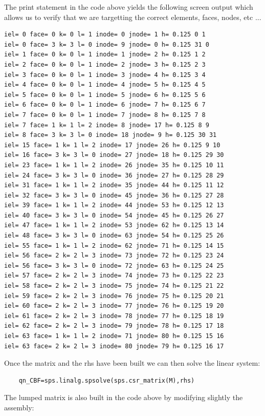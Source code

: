 The print statement in the code above yields the following screen output
which allows us to verify that we are targetting the correct elements, faces, nodes, etc ...
\begin{lstlisting}
iel= 0 face= 0 k= 0 l= 1 inode= 0 jnode= 1 h= 0.125 0 1
iel= 0 face= 3 k= 3 l= 0 inode= 9 jnode= 0 h= 0.125 31 0
iel= 1 face= 0 k= 0 l= 1 inode= 1 jnode= 2 h= 0.125 1 2
iel= 2 face= 0 k= 0 l= 1 inode= 2 jnode= 3 h= 0.125 2 3
iel= 3 face= 0 k= 0 l= 1 inode= 3 jnode= 4 h= 0.125 3 4
iel= 4 face= 0 k= 0 l= 1 inode= 4 jnode= 5 h= 0.125 4 5
iel= 5 face= 0 k= 0 l= 1 inode= 5 jnode= 6 h= 0.125 5 6
iel= 6 face= 0 k= 0 l= 1 inode= 6 jnode= 7 h= 0.125 6 7
iel= 7 face= 0 k= 0 l= 1 inode= 7 jnode= 8 h= 0.125 7 8
iel= 7 face= 1 k= 1 l= 2 inode= 8 jnode= 17 h= 0.125 8 9
iel= 8 face= 3 k= 3 l= 0 inode= 18 jnode= 9 h= 0.125 30 31
iel= 15 face= 1 k= 1 l= 2 inode= 17 jnode= 26 h= 0.125 9 10
iel= 16 face= 3 k= 3 l= 0 inode= 27 jnode= 18 h= 0.125 29 30
iel= 23 face= 1 k= 1 l= 2 inode= 26 jnode= 35 h= 0.125 10 11
iel= 24 face= 3 k= 3 l= 0 inode= 36 jnode= 27 h= 0.125 28 29
iel= 31 face= 1 k= 1 l= 2 inode= 35 jnode= 44 h= 0.125 11 12
iel= 32 face= 3 k= 3 l= 0 inode= 45 jnode= 36 h= 0.125 27 28
iel= 39 face= 1 k= 1 l= 2 inode= 44 jnode= 53 h= 0.125 12 13
iel= 40 face= 3 k= 3 l= 0 inode= 54 jnode= 45 h= 0.125 26 27
iel= 47 face= 1 k= 1 l= 2 inode= 53 jnode= 62 h= 0.125 13 14
iel= 48 face= 3 k= 3 l= 0 inode= 63 jnode= 54 h= 0.125 25 26
iel= 55 face= 1 k= 1 l= 2 inode= 62 jnode= 71 h= 0.125 14 15
iel= 56 face= 2 k= 2 l= 3 inode= 73 jnode= 72 h= 0.125 23 24
iel= 56 face= 3 k= 3 l= 0 inode= 72 jnode= 63 h= 0.125 24 25
iel= 57 face= 2 k= 2 l= 3 inode= 74 jnode= 73 h= 0.125 22 23
iel= 58 face= 2 k= 2 l= 3 inode= 75 jnode= 74 h= 0.125 21 22
iel= 59 face= 2 k= 2 l= 3 inode= 76 jnode= 75 h= 0.125 20 21
iel= 60 face= 2 k= 2 l= 3 inode= 77 jnode= 76 h= 0.125 19 20
iel= 61 face= 2 k= 2 l= 3 inode= 78 jnode= 77 h= 0.125 18 19
iel= 62 face= 2 k= 2 l= 3 inode= 79 jnode= 78 h= 0.125 17 18
iel= 63 face= 1 k= 1 l= 2 inode= 71 jnode= 80 h= 0.125 15 16
iel= 63 face= 2 k= 2 l= 3 inode= 80 jnode= 79 h= 0.125 16 17
\end{lstlisting}

Once the matrix and the rhs have been built we can then solve
the linear system:

\begin{lstlisting}
    qn_CBF=sps.linalg.spsolve(sps.csr_matrix(M),rhs)
\end{lstlisting}

The lumped matrix is also built in the code above
by modifying slightly the assembly:

